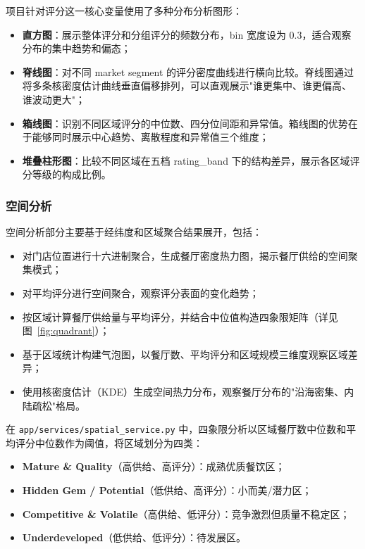\documentclass[11pt,a4paper]{article}
\begin{document}
项目针对评分这一核心变量使用了多种分布分析图形：
\begin{itemize}[leftmargin=2em]
    \item \textbf{直方图}：展示整体评分和分组评分的频数分布，bin 宽度设为 0.3，适合观察分布的集中趋势和偏态；

    \item \textbf{脊线图}：对不同 market segment 的评分密度曲线进行横向比较。脊线图通过将多条核密度估计曲线垂直偏移排列，可以直观展示"谁更集中、谁更偏高、谁波动更大"；

    \item \textbf{箱线图}：识别不同区域评分的中位数、四分位间距和异常值。箱线图的优势在于能够同时展示中心趋势、离散程度和异常值三个维度；

    \item \textbf{堆叠柱形图}：比较不同区域在五档 rating\_band 下的结构差异，展示各区域评分等级的构成比例。
\end{itemize}

\subsubsection{空间分析}

空间分析部分主要基于经纬度和区域聚合结果展开，包括：
\begin{itemize}[leftmargin=2em]
    \item 对门店位置进行十六进制聚合，生成餐厅密度热力图，揭示餐厅供给的空间聚集模式；
    \item 对平均评分进行空间聚合，观察评分表面的变化趋势；
    \item 按区域计算餐厅供给量与平均评分，并结合中位值构造四象限矩阵（详见图~\ref{fig:quadrant}）；
    \item 基于区域统计构建气泡图，以餐厅数、平均评分和区域规模三维度观察区域差异；
    \item 使用核密度估计（KDE）生成空间热力分布，观察餐厅分布的"沿海密集、内陆疏松"格局。
\end{itemize}

在 \texttt{app/services/spatial\_service.py} 中，四象限分析以区域餐厅数中位数和平均评分中位数作为阈值，将区域划分为四类：
\begin{itemize}[leftmargin=2em]
    \item \textbf{Mature \& Quality}（高供给、高评分）：成熟优质餐饮区；
    \item \textbf{Hidden Gem / Potential}（低供给、高评分）：小而美/潜力区；
    \item \textbf{Competitive \& Volatile}（高供给、低评分）：竞争激烈但质量不稳定区；
    \item \textbf{Underdeveloped}（低供给、低评分）：待发展区。
\end{itemize}
\end{document}

